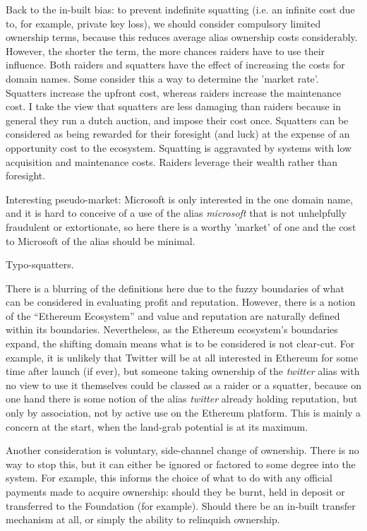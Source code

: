 \documentclass[10pt,a4paper]{article}
\begin{document}
Back to the in-built bias: to prevent indefinite squatting (i.e. an infinite cost due to, for example, private key loss), we should consider compulsory limited ownership terms, because this reduces average alias ownership costs considerably. However, the shorter the term, the more chances raiders have to use their influence. Both raiders and squatters have the effect of increasing the costs for domain names. Some consider this a way to determine the 'market rate'. Squatters increase the upfront cost, whereas raiders increase the maintenance cost. I take the view that squatters are less damaging than raiders because in general they run a dutch auction, and impose their cost once. Squatters can be considered as being rewarded for their foresight (and luck) at the expense of an opportunity cost to the ecosystem. Squatting is aggravated by systems with low acquisition and maintenance costs. Raiders leverage their wealth rather than foresight. 

Interesting pseudo-market: Microsoft is only interested in the one domain name, and it is hard to conceive of a use of the alias {\it microsoft} that is not unhelpfully fraudulent or extortionate, so here there is a worthy 'market' of one and the cost to Microsoft of the alias should be minimal.

Typo-squatters.

There is a blurring of the definitions here due to the fuzzy boundaries of what can be considered in evaluating profit and reputation. However, there is a notion of the ``Ethereum Ecosystem'' and value and reputation are naturally defined within its boundaries. Nevertheless, as the Ethereum ecosystem's boundaries expand, the shifting domain means what is to be considered is not clear-cut. For example, it is unlikely that Twitter will be at all interested in Ethereum for some time after launch (if ever), but someone taking ownership of the {\it twitter} alias with no view to use it themselves could be classed as a raider or a squatter, because on one hand there is some notion of the alias {\it twitter} already holding reputation, but only by association, not by active use on the Ethereum platform. This is mainly a concern at the start, when the land-grab potential is at its maximum.

Another consideration is voluntary, side-channel change of ownership. There is no way to stop this, but it can either be ignored or factored to some degree into the system. For example, this informs the choice of what to do with any official payments made to acquire ownership: should they be burnt, held in deposit or transferred to the Foundation (for example). Should there be an in-built transfer mechanism at all, or simply the ability to relinquish ownership.
\end{document}
